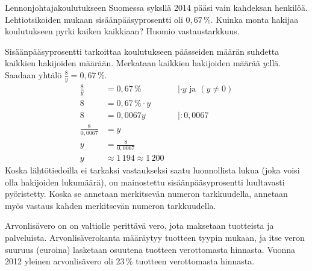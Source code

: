 \begin{esimerkki}
Lennonjohtajakoulutukseen Suomessa syksllä 2014 pääsi vain kahdeksan henkilöä. Lehtiotsikoiden mukaan sisäänpääsyprosentti oli $0,67\,\%$. Kuinka monta hakijaa koulutukseen pyrki kaiken kaikkiaan? Huomio vastaustarkkuus. %
	\begin{esimratk}
	Sisäänpääsyprosentti tarkoittaa koulutukseen päässeiden määrän suhdetta kaikkien hakijoiden määrään. Merkataan kaikkien hakijoiden määrää $y$:llä. Saadaan yhtälö $\frac{8}{y}=0,67\,\%$.
	\begin{align*}
	\frac{8}{y}&=0,67\,\% &&|\cdot y\text{ ja } (y\neq 0) \\
	8&=0,67\,\%\cdot y && \\
	8&= 0,0067y && |:0,0067 \\
	\frac{8}{0,0067}&=y && \\
	y&=\frac{8}{0,0067} && \\
	y&\approx 1\,194 \approx 1\,200
	\end{align*}
	Koska lähtötiedoilla ei tarkaksi vastaukseksi saatu luonnollista lukua (joka voisi olla hakijoiden lukumäärä), on mainostettu sisäänpääsyprosentti luultavasti pyöristetty. Koska se annetaan merkitsevän numeron tarkkuudella, annetaan myös vastaus kahden merkitsevän numeron tarkkuudella. %
	\end{esimratk}
\end{esimerkki}

\begin{esimerkki}
Arvonlisävero on on valtiolle perittävä vero, jota maksetaan tuotteista ja palveluista. Arvonlisäverokanta määräytyy tuotteen tyypin mukaan, ja itse veron suuruus (euroina) lasketaan osuutena tuotteen verottomasta hinnasta. Vuonna 2012 yleinen arvonlisävero oli $23$\,\% tuotteen verottomasta hinnasta.
	\begin{esimratk}
	\end{esimratk}
	\begin{esimvast}
	\end{esimvast}
\end{esimerkki}

